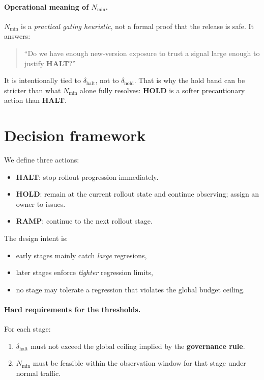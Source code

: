 \documentclass{article}
\newcommand{\dhalt}{\delta_{\text{halt}}}
\newcommand{\dhold}{\delta_{\text{hold}}}
\begin{document}
\paragraph{Operational meaning of $N_{\min}$.}
$N_{\min}$ is a \emph{practical gating heuristic}, not a formal proof that the release is safe.
It answers:
\begin{quote}
``Do we have enough new-version exposure to trust a signal large enough to justify \textbf{HALT}?''
\end{quote}

It is intentionally tied to $\dhalt$, not to $\dhold$. 
That is why the hold band can be stricter than what $N_{\min}$ alone fully resolves:
\textbf{HOLD} is a softer precautionary action than \textbf{HALT}.


\section{Decision framework}

We define three actions:

\begin{itemize}[leftmargin=1.4em]
    \item \textbf{HALT}: stop rollout progression immediately.
    \item \textbf{HOLD}: remain at the current rollout state and continue observing; assign an owner to issues.
    \item \textbf{RAMP}: continue to the next rollout stage.
\end{itemize}

The design intent is:

\begin{itemize}[leftmargin=1.4em]
    \item early stages mainly catch \emph{large} regresions,
    \item later stages enforce \emph{tighter} regression limits,
    \item no stage may tolerate a regression that violates the global budget ceiling.
\end{itemize}

\paragraph{Hard requirements for the thresholds.}
For each stage:
\begin{enumerate}[leftmargin=1.4em]
    \item $\dhalt$ must not exceed the global ceiling implied by the \textbf{governance rule}.
    \item $N_{\min}$ must be feasible within the observation window for that stage under normal traffic.
\end{enumerate}
\end{document}
